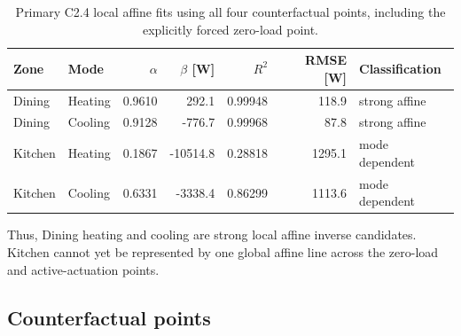 \documentclass[11pt]{article}
\begin{document}
\begin{table}[htbp]
\centering
\small
\begin{tabular}{llrrrrl}
\toprule
Zone & Mode & $\alpha$ & $\beta$ [W] & $R^2$ & RMSE [W] & Classification \\
\midrule
Dining & Heating & 0.9610 & 292.1 & 0.99948 & 118.9 & strong affine \\
Dining & Cooling & 0.9128 & -776.7 & 0.99968 & 87.8 & strong affine \\
Kitchen & Heating & 0.1867 & -10514.8 & 0.28818 & 1295.1 & mode dependent \\
Kitchen & Cooling & 0.6331 & -3338.4 & 0.86299 & 1113.6 & mode dependent \\
\bottomrule
\end{tabular}
\caption{Primary C2.4 local affine fits using all four counterfactual points,
including the explicitly forced zero-load point.}
\label{tab:c24-affine}
\end{table}

Thus, Dining heating and cooling are strong local affine inverse candidates.
Kitchen cannot yet be represented by one global affine line across the
zero-load and active-actuation points.

\subsection{Counterfactual points}
\end{document}
